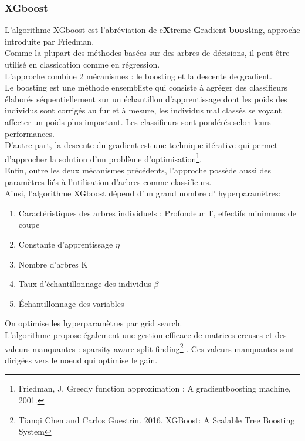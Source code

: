 \documentclass[french]{article}
\begin{document}
\begin{multicols}{2}
\subsubsection{XGboost}
L’algorithme XGboost est l'abréviation de e\textbf{X}treme \textbf{G}radient \textbf{boost}ing, approche introduite par Friedman\footnotemark[11].\\
Comme la plupart des méthodes basées sur des arbres de décisions, il peut être utilisé en classication comme en régression.\\
L'approche combine 2 mécanismes : le boosting et la descente de gradient.\\
Le boosting est une méthode ensembliste qui consiste à agréger des classifieurs élaborés séquentiellement sur un échantillon d’apprentissage dont les poids des individus sont corrigés au fur et à mesure, les individus mal classés se voyant affecter un poids plus important. Les classifieurs sont pondérés selon leurs performances.\\
D'autre part, la descente du gradient est une technique itérative qui permet d’approcher la solution d’un problème d’optimisation\footnote{\cite{art1} Friedman, J. Greedy function approximation : A gradientboosting machine, 2001.}.\\
Enfin, outre les deux mécanismes précédents, l’approche possède aussi des paramètres liés à l’utilisation d’arbres comme classifieurs.\\
Ainsi, l’algorithme XGboost dépend d’un grand nombre d' hyperparamètres: 
\begin{enumerate}
    \item Caractéristiques des
arbres individuels : Profondeur T, effectifs minimums de coupe 
\item Constante
d'apprentissage $\eta$
\item Nombre d'arbres K
\item Taux d'échantillonnage des individus $\beta$
\item Échantillonnage des variables
\end{enumerate}
On optimise les hyperparamètres par grid search.\\
L'algorithme propose également une gestion efficace de matrices creuses et des valeurs manquantes : \og sparsity-aware split finding\footnote{\cite{chen2016xgboost} Tianqi Chen and Carlos Guestrin. 2016. XGBoost: A Scalable Tree Boosting System} \fg{}. Ces valeurs manquantes sont dirigées vers le noeud qui optimise le gain.


\end{multicols}
\end{document}

